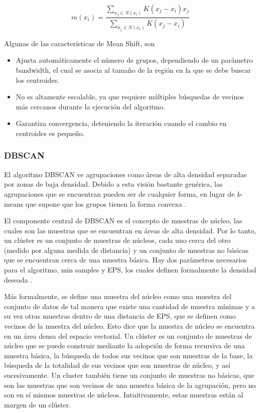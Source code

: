 \begin{equation}		
	m(x_i) = \frac{\sum_{x_j \in N(x_i)}K(x_j - x_i)x_j}{\sum_{x_j \in N(x_i)}K(x_j - x_i)}
\end{equation}

Algunas de las características de Mean Shift, son

\begin{itemize}
	
	\item Ajusta automáticamente el número de grupos, dependiendo de un parámetro bandwidth, el cual se asocia al tamaño de la región en la que se debe buscar los centroides. 
	
	\item No es altamente escalable, ya que requiere múltiples búsquedas de vecinos más cercanos durante la ejecución del algoritmo. 
	
	\item Garantiza convergencia, deteniendo la iteración cuando el cambio en centroides es pequeño.
		
\end{itemize}

\subsubsection{DBSCAN}

El algoritmo DBSCAN ve agrupaciones como áreas de alta densidad separadas por zonas de baja densidad. Debido a esta visión bastante genérica, las agrupaciones que se encuentran pueden ser de cualquier forma, en lugar de \textit{k}-means  que supone que los grupos tienen la forma convexa \cite{tran2013revised}.

El componente central de DBSCAN es el concepto de muestras de núcleo, las cuales son las muestras que se encuentran en áreas de alta densidad. Por lo tanto, un clúster es un conjunto de muestras de núcleos, cada uno cerca del otro (medido por alguna medida de distancia) y un conjunto de muestras no básicas que se encuentran cerca de una muestra básica. Hay dos parámetros necesarios para el algoritmo, min samples y EPS, los cuales definen formalmente la densidad deseada \cite{tran2013revised}.


Más formalmente, se define una muestra del núcleo como una muestra del conjunto de datos de tal manera que existe una cantidad de muestra mínimas y a su vez otras muestras dentro de una distancia de EPS, que se definen como vecinos de la muestra del núcleo. Esto dice que la muestra de núcleo se encuentra en un área densa del espacio vectorial. Un clúster es un conjunto de muestras de núcleo que se puede construir mediante la adopción de forma recursiva de una muestra básica, la búsqueda de todos sus vecinos que son muestras de la base, la búsqueda de la totalidad de sus vecinos que son muestras de núcleo, y así sucesivamente. Un cluster también tiene un conjunto de muestras no básicas, que son las muestras que son vecinos de una muestra básica de la agrupación, pero no son en sí mismos muestras de núcleos. Intuitivamente, estas muestras están al margen de un clúster.


